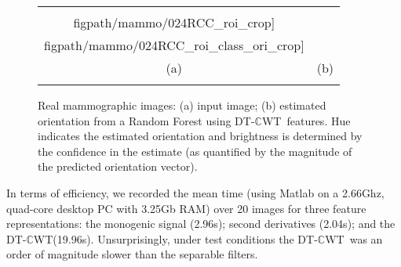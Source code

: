 \documentclass[runningheads,a4paper]{llncs}
\newcommand{\fref}[1]{Figure~\ref{#1}}
\def\dtcwt{DT-$\mathbb{C}$WT}
\def\figpath{./figs}
\def\ie{i.e.}
\begin{document}
\begin{figure}[t]
\centering
\begin{tabular}{@{}c c@{}}
\texttt{[image: \\figpath/mammo/024RCC\_roi\_crop]} &
\texttt{[image: \\figpath/mammo/024RCC\_roi\_class\_ori\_crop]} \\
(a) & (b) \\
\noalign{\smallskip}
\end{tabular}
%
\caption{Real mammographic images: %
(a) input image; %
(b) estimated orientation from a Random Forest using \dtcwt~features. Hue indicates the estimated orientation and brightness is determined by the confidence in the estimate (as quantified by the magnitude of the predicted orientation vector).}
\label{f:real_mammography}
\end{figure}

In terms of efficiency, we recorded the mean time (using Matlab on a 2.66Ghz, quad-core desktop PC with 3.25Gb RAM) over 20 images for three feature representations: the monogenic signal (2.96s); second derivatives (2.04s); and the \dtcwt (19.96s). Unsurprisingly, under test conditions the \dtcwt~was an order of magnitude slower than the separable filters. %


\end{document}
